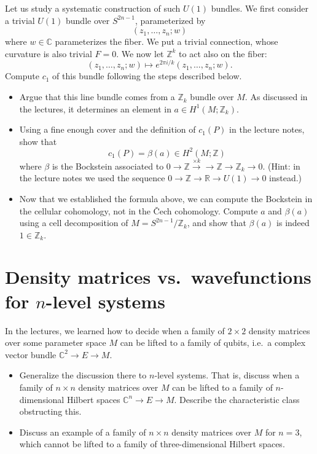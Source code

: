 \documentclass[11pt,a4paper]{article}
\def\bC{\mathbb{C}}
\def\bR{\mathbb{R}}
\def\bZ{\mathbb{Z}}
\begin{document}
Let us study a systematic construction of such $U(1)$ bundles.
We first consider a trivial $U(1)$ bundle over $S^{2n-1}$, parameterized by \[
(z_1,\ldots,z_n;w)
\] where $w\in \bC$ parameterizes the fiber. 
We put a trivial connection, whose  curvature is also trivial $F=0$.
We now let $\bZ^k$ to act also on the fiber: \[
(z_1,\ldots,z_n;w)\mapsto e^{2\pi i/k} (z_1,\ldots, z_n;w).
\]
Compute $c_1$ of this bundle  following the steps described below.
\begin{itemize}
\item Argue that this line bundle comes from a $\bZ_k$ bundle over $M$.
As discussed in the lectures, it determines an element in $a\in H^1(M;\bZ_k)$.
\item Using a fine enough cover and the definition of $c_1(P)$ in the lecture notes, 
show that  \[
c_1(P)=\beta(a)\in H^2(M;\bZ)
\]
where $\beta$ is the Bockstein associated to $0\to\bZ \xrightarrow{\times k}\to \bZ\to \bZ_k\to 0$.
(Hint: in the lecture notes we used the sequence $0\to\bZ\to \bR\to U(1)\to 0$ instead.)
\item 
Now that we established the formula above, we can compute the Bockstein in the cellular cohomology,
not in the \v Cech cohomology.
Compute $a$ and $\beta(a)$ using a cell decomposition of $M=S^{2n-1}/\bZ_k$,
and show that $\beta(a)$ is indeed $1\in \bZ_k$.
\end{itemize}

\section{Density matrices vs.~wavefunctions for $n$-level systems}

In the lectures, we learned how to decide when a family 
of $2\times 2$ density matrices over some parameter space $M$
can be lifted to a family of qubits, i.e.~a complex vector bundle $\bC^2\to E\to M$.

\begin{itemize}
\item Generalize the discussion there to  $n$-level systems. That is,
discuss when a family of $n\times n$ density matrices over $M$
can be lifted to a family of $n$-dimensional Hilbert spaces $\bC^n\to E\to M$.
Describe the characteristic class obstructing  this.
\item Discuss an example of a family of $n\times n$ density matrices  over $M$ for $n=3$,
which cannot be lifted to a family of three-dimensional Hilbert spaces.
\end{itemize}
\end{document}
